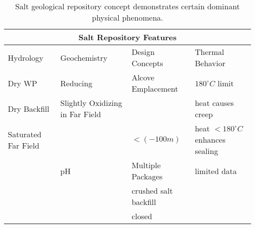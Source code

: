 %
\begin{table}[h!]
  \centering
  \footnotesize{
  \begin{tabular}{|l|l|l|l|}
    \multicolumn{4}{c}{\textbf{Salt Repository Features}}\\
    \hline
    Hydrology & Geochemistry & Design Concepts & Thermal Behavior \\ 
    \hline
    Dry WP&Reducing & Alcove Emplacement & $180^\circ C$ limit \cite{von_lensa_red-impact_2008} \\
    Dry Backfill&Slightly Oxidizing in Far Field & & heat causes creep \\
    Saturated Far Field&&$<(-100m)$& heat $<180^\circ C$ enhances sealing \\
    &pH& Multiple Packages&limited data\\
    &&crushed salt backfill&\\
    &&closed&\\
    \hline
  \end{tabular}
  \caption[Salt Repository Features]{Salt geological repository 
  concept demonstrates certain dominant physical phenomena. }
  \label{tab:salt_tab}
  }
\end{table}



